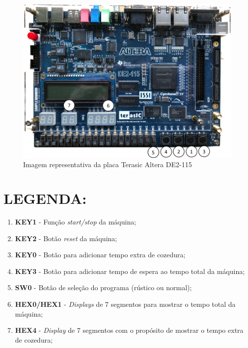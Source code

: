 \documentclass{article}
\begin{document}
    \begin{multicols}{2}
        \begin{figure}[H]
            \centering
            \includegraphics[scale=0.3]{FPGA}
            \caption{Imagem representativa da placa Terasic Altera DE2-115}
            \label{fig:fpga}
        \end{figure}

        \section*{LEGENDA:}
        \begin{enumerate}
            \item \textbf{KEY1} - Função \textit{start/stop} da máquina;
            \item \textbf{KEY2} - Botão \textit{reset} da máquina;
            \item \textbf{KEY0} - Botão para adicionar tempo extra de cozedura;
            \item \textbf{KEY3} - Botão para adicionar tempo de espera ao tempo total da máquina;
            \item \textbf{SW0} - Botão de seleção do programa (rústico ou normal);
            \item \textbf{HEX0/HEX1} - \textit{Displays} de 7 segmentos para mostrar o tempo total da máquina;
            \item \textbf{HEX4} - \textit{Display} de 7 segmentos  com o propósito de mostrar o tempo extra de cozedura;
        \end{enumerate}
    \end{multicols}
\end{document}
